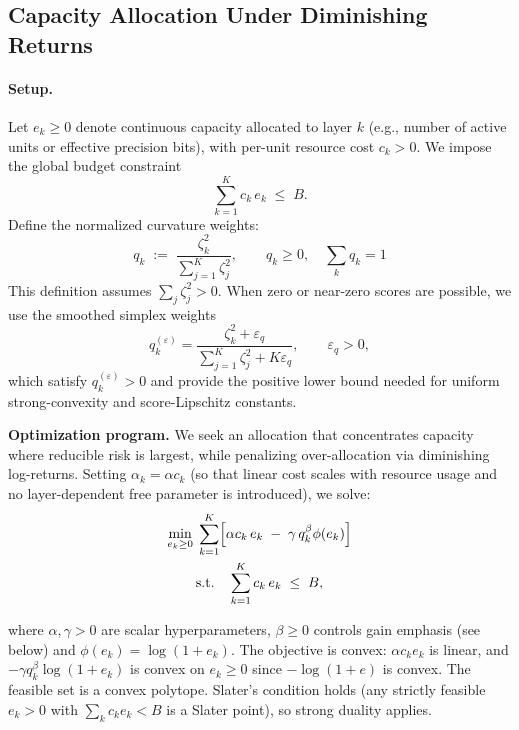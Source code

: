 \documentclass[accepted]{uai2026}%
\theoremstyle{remark}%
\begin{document}
\subsection{Capacity Allocation Under Diminishing Returns}
\label{sec:alloc}
\paragraph{Setup.}
Let $e_k \ge 0$ denote continuous capacity allocated to layer $k$
(e.g., number of active units or effective precision bits),
with per-unit resource cost $c_k > 0$.
We impose the global budget constraint
\begin{equation}
  \label{eq:Budget}
  \sum_{k=1}^{K} c_k\,e_k \;\le\; B.
\end{equation}
Define the normalized curvature weights:
\begin{equation}
  \label{eq:qk}
  q_k
  \;:=\;
  \frac{\zeta_k^{2}}{\sum_{j=1}^{K}\zeta_j^{2}},
  \qquad q_k \ge 0,\quad \sum_k q_k = 1
\end{equation}
This definition assumes $\sum_j\zeta_j^2>0$. When zero or
near-zero scores are possible, we use the smoothed simplex weights
\[
q_k^{(\varepsilon)}
=
\frac{\zeta_k^2+\varepsilon_q}{\sum_{j=1}^K\zeta_j^2+K\varepsilon_q},
\qquad \varepsilon_q>0,
\]
which satisfy $q_k^{(\varepsilon)}>0$ and provide the positive lower bound
needed for uniform strong-convexity and score-Lipschitz constants.


\textbf{Optimization program.}
We seek an allocation that concentrates capacity where reducible risk is
largest, while penalizing over-allocation via diminishing log-returns.
Setting $\alpha_k = \alpha c_k$ (so that linear cost scales with resource
usage and no layer-dependent free parameter is introduced),
we solve: 
\begin{multline}
  \label{eq:alloc_program}
  \min_{e_k \ge 0}
  \;\sum_{k=1}^{K}
  \Bigl[
    \alpha c_k\,e_k
    \;-\;
    \gamma\, q_k^{\beta}\phi(e_k)
  \Bigr]
  \\
  \text{s.t.}
  \quad
  \sum_{k=1}^{K} c_k\,e_k \;\le\; B,
\end{multline}

where $\alpha, \gamma > 0$ are scalar hyperparameters,
$\beta \ge 0$ controls gain emphasis (see below) and $\phi(e_k) = \log(1 + e_k)$.
The objective is convex:
$\alpha c_k e_k$ is linear, and $-\gamma q_k^{\beta}\log(1+e_k)$ is convex
on $e_k \ge 0$ since $-\log(1+e)$ is convex.
The feasible set is a convex polytope.
Slater's condition \citet{boyd2004convex} holds (any strictly feasible $e_k > 0$ with
$\sum_k c_k e_k < B$ is a Slater point), so strong duality applies.
\end{document}
